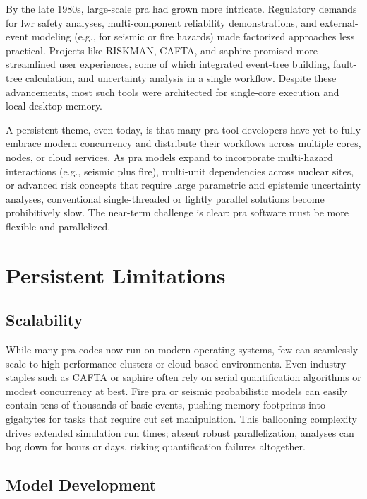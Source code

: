 By the late 1980s, large-scale \acrshort{pra} had grown more intricate. Regulatory demands for \acrshort{lwr} safety analyses, multi-component reliability demonstrations, and external-event modeling (e.g., for seismic or fire hazards) made factorized approaches less practical. Projects like RISKMAN, CAFTA, and \acrshort{saphire} promised more streamlined user experiences, some of which integrated event-tree building, fault-tree calculation, and uncertainty analysis in a single workflow. Despite these advancements, most such tools were architected for single-core execution and local desktop memory.

A persistent theme, even today, is that many \acrshort{pra} tool developers have yet to fully embrace modern concurrency and distribute their workflows across multiple cores, nodes, or cloud services. As \acrshort{pra} models expand to incorporate multi-hazard interactions (e.g., seismic plus fire), multi-unit dependencies across nuclear sites, or advanced risk concepts that require large parametric and epistemic uncertainty analyses, conventional single-threaded or lightly parallel solutions become prohibitively slow. The near-term challenge is clear: \acrshort{pra} software must be more flexible and parallelized.


\section{Persistent Limitations}

\subsection{Scalability}

While many \acrshort{pra} codes now run on modern operating systems, few can seamlessly scale to high-performance clusters or cloud-based environments. Even industry staples such as CAFTA or \acrshort{saphire} often rely on serial quantification algorithms or modest concurrency at best. Fire \acrshort{pra} or seismic probabilistic models can easily contain tens of thousands of basic events, pushing memory footprints into gigabytes for tasks that require cut set manipulation. This ballooning complexity drives extended simulation run times; absent robust parallelization, analyses can bog down for hours or days, risking quantification failures altogether.

\subsection{Model Development}

